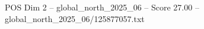 \begin{textsample}{POS Dim 2 – global\_north\_2025\_06 – Score 27.00 – global\_north\_2025\_06/125877057.txt}
\end{textsample}
